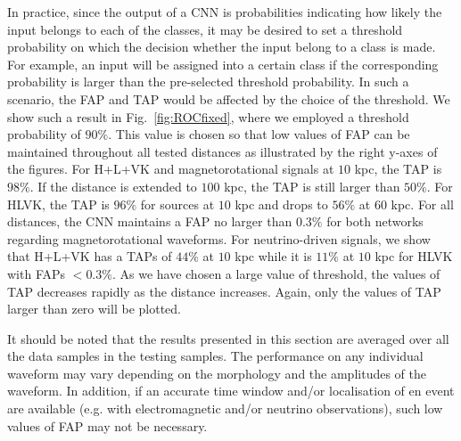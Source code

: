 \documentclass[aps,twocolumn,showpacs,groupedaddress, nofootinbib]{revtex4}  %
\begin{document}
In practice, since the output of a \ac{CNN} is probabilities indicating how
likely the input belongs to each of the classes, it may be desired to set a
threshold probability on which the decision whether the input belong to a class is made.
For example, an input will be assigned into a certain class if the
corresponding probability is larger than the pre-selected threshold probability. In such a
scenario, the \ac{FAP} and \ac{TAP} would be affected by the choice of the
threshold. We show such a result in Fig.~\ref{fig:ROCfixed}, where we employed
a threshold probability of $90\%$. 
This value is chosen so that low values of \ac{FAP} can be maintained throughout all tested distances
as illustrated by the right y-axes of the figures.
For H+L+VK and magnetorotational signals at $10$ kpc, the \ac{TAP} is $98\%$. 
If the distance is extended to $100$ kpc, the \ac{TAP} is still larger than $50\%$. 
For HLVK, the \ac{TAP} is $96\%$ for sources at $10$ kpc and drops to $56\%$ at
$60$ kpc.
For all distances, the \ac{CNN} maintains a \ac{FAP} no larger than $0.3\%$ for
both networks regarding magnetorotational waveforms. For neutrino-driven
signals, we show that H+L+VK has a \acp{TAP} of $44\%$ at $10$ kpc while it
is $11\%$ at $10$ kpc for HLVK with \acp{FAP} $< 0.3\%$.
As we have chosen a large value of threshold, the values of \ac{TAP} decreases rapidly 
as the distance increases. Again, only the values of \ac{TAP} larger than zero will be plotted.

It should be noted that the results presented in this section are
averaged over all the data samples in the testing samples. The performance on
any individual waveform may vary depending on the morphology and the amplitudes
of the waveform. 
In addition, if an accurate time window and/or localisation of en event are available
(e.g. with electromagnetic and/or neutrino observations), 
such low values of \ac{FAP} may not be necessary. 
\end{document}
